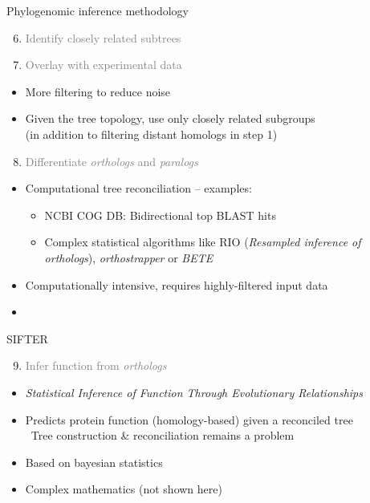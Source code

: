 \documentclass[14pt,xcolor=dvipsnames,pdftex]{beamer}
\begin{document}
\begin{frame}[allowframebreaks]{Phylogenomic inference methodology}
\begin{itemize}
 \end{itemize}
 \framebreak
 \begin{enumerate}
  \setcounter{enumi}{5}
  \item \textcolor{gray}{Identify closely related subtrees}
  \item \textcolor{gray}{Overlay with experimental data}
 \end{enumerate}
 \begin{itemize}
  \item More filtering to reduce noise
  \item Given the tree topology, use only closely related subgroups\\
        (in addition to filtering distant homologs in step 1)
 \end{itemize}
 \framebreak
 \begin{enumerate}
  \setcounter{enumi}{7}
  \item \textcolor{gray}{Differentiate \textit{orthologs} and \textit{paralogs}}
 \end{enumerate}
 \begin{itemize}
  \item Computational tree reconciliation -- examples:
  \begin{itemize}
  \item NCBI COG DB: Bidirectional top BLAST hits
  \item Complex statistical algorithms like RIO (\textit{Resampled inference of orthologs}), \textit{orthostrapper} or \textit{BETE}
  \end{itemize}
  \item Computationally intensive, requires highly-filtered input data
  \item
 \end{itemize}
\end{frame}

\begin{frame}{SIFTER}
 \begin{enumerate}
  \setcounter{enumi}{8}
  \item \textcolor{gray}{Infer function from \textit{orthologs}}
 \end{enumerate}
\begin{itemize}
 \item \textit{Statistical Inference of Function Through Evolutionary Relationships}
 \item Predicts protein function (homology-based) given a reconciled tree\\
 \textrightarrow\ Tree construction \& reconciliation remains a problem
 \item Based on bayesian statistics
 \item Complex mathematics (not shown here)
\end{itemize}
\end{frame}
\end{document}
